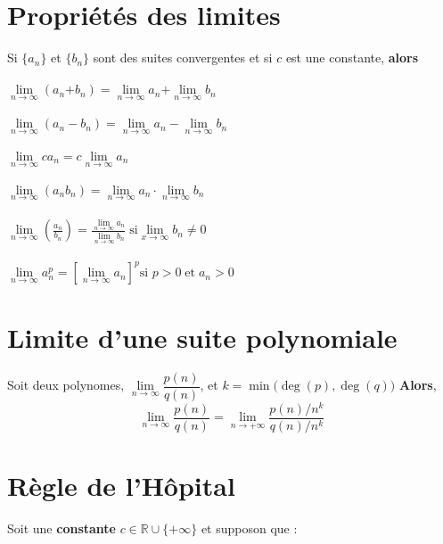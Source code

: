 \documentclass{report}
\begin{document}
\begin{multicols*}{3}
    \section{Propriétés des limites}
        Si $\{a_n\}$ et $\{b_n\}$ sont des suites convergentes et 
        si $c$ est une constante, \textbf{alors} \\\\ 
        $\lim\limits_{n\to\infty  }\left(a_n \text{+} b_n \right) = 
        \lim\limits_{n\to\infty  }a_n \text{+} 
        \lim\limits_{n\to\infty  }b_n$
        \\\\
        $\lim\limits_{n\to\infty  }\left(a_n - b_n \right) = 
        \lim\limits_{n\to\infty  }a_n - \lim\limits_{n\to\infty  }b_n$ 
        \\\\
        $\lim\limits_{n\to\infty  }ca_n = c \lim\limits_{n \to \infty  }a_n$ 
        \\\\
        $\lim\limits_{n\to\infty  }\left(a_nb_n \right) = 
        \lim\limits_{n\to\infty  }a_n \cdot \lim\limits_{n\to\infty  }b_n$
        \\\\
        $\lim\limits_{n\to\infty  }\left(\frac{a_n}{b_n} \right) = 
        \frac{\lim\limits_{n\to\infty  }a_n}{\lim\limits_{n\to\infty  }b_n}
        \;
        \text{si} \lim\limits_{x\to\infty  }b_n \neq 0$
        \\\\
        $\lim\limits_{n\to\infty  }a_n^{p} = 
        \left[\lim\limits_{n\to\infty  }a_n \right]^p \text{si } 
        p > 0 \; \text{et} \; a_n > 0$



    \section{Limite d'une suite polynomiale} 
        Soit deux polynomes,
        $\lim\limits_{n\to \infty } \dfrac{p(n)}{q(n)}$, 
        et 
        $k = \min\bigl(\deg(p), \deg(q)\bigr)$
        \textbf{Alors},   
        \[ \lim\limits_{n\to \infty } \dfrac{p(n)}{q(n)} =
        \lim\limits_{n\to+\infty}\dfrac{p(n)/{n^k}}{q(n)/n^{k}} \]



    \section{Règle de l'Hôpital}
        Soit une \textbf{constante} $c \in \mathbb{R} \cup \{+\infty\}$ et 
        supposon que : 


\end{multicols*}
\end{document}
